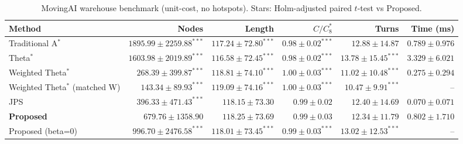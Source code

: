 \begin{table}[htbp]
\centering\small
\caption{MovingAI warehouse benchmark (unit-cost, no hotspots). Stars: Holm-adjusted paired $t$-test vs Proposed.}\label{tab:movingai}
\begin{tabular}{lrrrrr}
\toprule
Method & Nodes & Length & $C/C^*_8$ & Turns & Time (ms) \\
\midrule
Traditional A$^{*}$ & $1895.99\pm2259.88^{***}$ & $117.24\pm72.80^{***}$ & $0.98\pm0.02^{***}$ & $12.88\pm14.87$ & $0.789\pm0.976$ \\
Theta$^{*}$ & $1603.98\pm2019.89^{***}$ & $116.58\pm72.45^{***}$ & $0.98\pm0.02^{***}$ & $13.78\pm15.45^{***}$ & $3.329\pm6.021$ \\
Weighted Theta$^{*}$ & $268.39\pm399.87^{***}$ & $118.81\pm74.10^{***}$ & $1.00\pm0.03^{***}$ & $11.02\pm10.48^{***}$ & $0.275\pm0.294$ \\
Weighted Theta$^{*}$ (matched W) & $143.34\pm89.93^{***}$ & $119.09\pm74.16^{***}$ & $1.00\pm0.03^{***}$ & $10.47\pm9.91^{***}$ & -- \\
JPS & $396.33\pm471.43^{***}$ & $118.15\pm73.30$ & $0.99\pm0.02$ & $12.40\pm14.69$ & $0.070\pm0.071$ \\
\textbf{Proposed} & $679.76\pm1358.90$ & $118.25\pm73.69$ & $0.99\pm0.03$ & $12.34\pm11.79$ & $0.802\pm1.710$ \\
Proposed (beta=0) & $996.70\pm2476.58^{***}$ & $118.01\pm73.45^{***}$ & $0.99\pm0.03^{***}$ & $13.02\pm12.53^{***}$ & -- \\
\bottomrule
\end{tabular}
\end{table}
